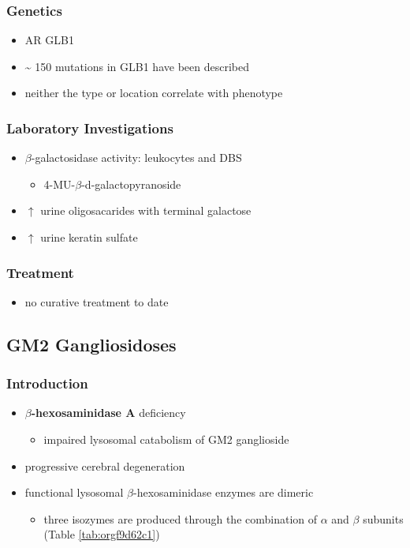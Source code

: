 \documentclass[12pt]{scrartcl}
\begin{document}
\subsubsection{Genetics}
\label{sec:orgfcc8814}
\begin{itemize}
\item AR GLB1
\item \textasciitilde{} 150 mutations in GLB1 have been described
\item neither the type or location correlate with phenotype
\end{itemize}
\subsubsection{Laboratory Investigations}
\label{sec:org7a70c9c}
\begin{itemize}
\item \(\beta\)-galactosidase activity: leukocytes and DBS
\begin{itemize}
\item 4-MU-\(\beta\)-d-galactopyranoside
\end{itemize}
\item \(\uparrow\) urine oligosacarides with terminal galactose
\item \(\uparrow\) urine keratin sulfate
\end{itemize}

\subsubsection{Treatment}
\label{sec:org9f45f77}
\begin{itemize}
\item no curative treatment to date
\end{itemize}
\subsection{GM2 Gangliosidoses}
\label{sec:org994108e}
\subsubsection{Introduction}
\label{sec:org2957487}
\begin{itemize}
\item \textbf{\(\beta\)-hexosaminidase A} deficiency 
\begin{itemize}
\item impaired lysosomal catabolism of GM2 ganglioside
\end{itemize}
\item progressive cerebral degeneration
\item functional lysosomal \(\beta\)-hexosaminidase enzymes are dimeric
\begin{itemize}
\item three isozymes are produced through the combination of \(\alpha\)
and \(\beta\) subunits (Table \ref{tab:orgf9d62c1})
\end{itemize}
\end{itemize}
\end{document}
